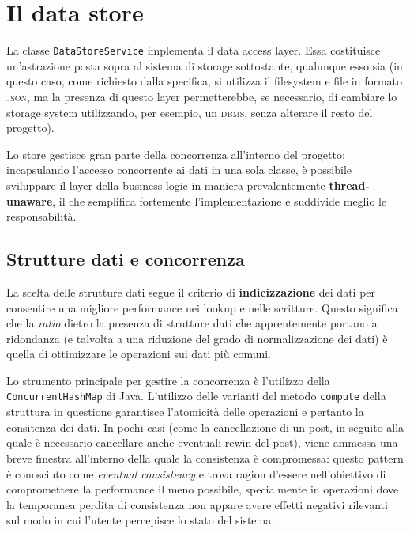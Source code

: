 \documentclass[a4paper,8pt]{article} %
\def\code#1{\texttt{#1}}
\begin{document}
\section{Il data store}
La classe \code{DataStoreService} implementa il data access layer. Essa costituisce un'astrazione posta sopra al sistema di storage sottostante, qualunque esso sia
(in questo caso, come richiesto dalla specifica, si utilizza il filesystem e file in formato \textsc{json}, ma la presenza di questo layer permetterebbe, se necessario, di cambiare lo storage system
utilizzando, per esempio, un \textsc{dbms}, senza alterare il resto del progetto).
\par Lo store gestisce gran parte della concorrenza all'interno del progetto: incapsulando l'accesso concorrente ai dati in una sola classe,
è possibile sviluppare il layer della business logic in maniera prevalentemente \textbf{thread-unaware}, il che semplifica fortemente l'implementazione e suddivide meglio le responsabilità.
\subsection{Strutture dati e concorrenza}
La scelta delle strutture dati segue il criterio di \textbf{indicizzazione} dei dati per consentire una migliore performance nei lookup e nelle scritture. Questo significa che la \emph{ratio} dietro
la presenza di strutture dati che apprentemente portano a ridondanza (e talvolta a una riduzione del grado di normalizzazione dei dati) è quella di ottimizzare le operazioni sui dati più comuni.
\par Lo strumento principale per gestire la concorrenza è l'utilizzo della \code{ConcurrentHashMap} di Java. L'utilizzo delle varianti del metodo \code{compute} della struttura in questione garantisce l'atomicità
delle operazioni e pertanto la consitenza dei dati. In pochi casi (come la cancellazione di un post, in seguito alla quale è necessario cancellare anche eventuali rewin del post), viene ammessa una breve finestra
all'interno della quale la consistenza è compromessa: questo pattern è conosciuto come \emph{eventual consistency} e trova ragion d'essere nell'obiettivo di compromettere la performance il meno possibile, specialmente
in operazioni dove la temporanea perdita di consistenza non appare avere effetti negativi rilevanti sul modo in cui l'utente percepisce lo stato del sistema.
\end{document}
